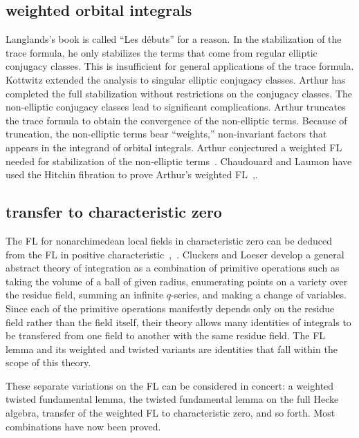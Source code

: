 \documentclass[brochure,english,12pt]{bourbaki}
\begin{document}

\subsection{weighted orbital integrals}

Langlands's book is called ``Les d\'ebuts'' for a reason.  In the
stabilization of the trace formula, he only stabilizes the terms that
come from regular elliptic conjugacy classes.  This is insufficient
for general applications of the trace formula.  Kottwitz extended the
analysis to singular elliptic conjugacy classes.  Arthur has
completed the full stabilization without restrictions on the conjugacy
classes.  The non-elliptic conjugacy classes lead to significant
complications.  Arthur truncates the trace formula to obtain the convergence
of the non-elliptic terms.  Because of truncation, the non-elliptic
terms bear ``weights,'' non-invariant factors that appears in the
integrand of orbital integrals.  Arthur conjectured a weighted
FL needed for stabilization of the non-elliptic
terms~\cite{Arthur:2002}.  Chaudouard and Laumon have used the
Hitchin fibration to prove Arthur's weighted FL~\cite{CL:2009:I},\cite{CL:2009:II}.


\subsection{transfer to characteristic zero}

The FL for nonarchimedean local fields in
characteristic zero can be deduced from the FL in
positive characteristic~\cite{Wald:2006},~\cite{CHL:2010}.  Cluckers and Loeser develop a
general abstract theory of integration as a combination of primitive
operations such as taking the volume of a ball of given radius,
enumerating points on a variety over the residue field, summing an
infinite $q$-series, and making a change of variables.  Since
each of the primitive operations manifestly depends only on the
residue field rather than the field itself, their theory allows many
identities of integrals to be transfered from one field to another
with the same residue field.  The FL lemma and its weighted and
twisted variants are identities that fall within the scope of this
theory.

These separate variations on the FL can be considered in concert: a
weighted twisted fundamental lemma, the twisted fundamental lemma on
the full Hecke algebra, transfer of the weighted FL to characteristic zero, and so forth.
Most combinations have now been proved.
\end{document}
